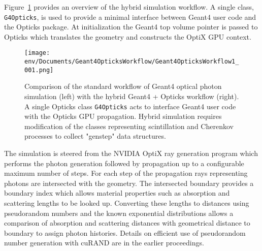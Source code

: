 \documentclass{webofc}
\begin{document}
Figure~\ref{workflow} provides an overview of the hybrid simulation workflow. 
A single class, {\tt G4Opticks}, is used to provide a 
minimal interface between Geant4 user code and 
the Opticks package. 
At initialization the Geant4 top volume pointer is
passed to Opticks which translates the geometry and constructs 
the OptiX GPU context.




%
\begin{figure}
\centering
\texttt{[image: env/Documents/Geant4OpticksWorkflow/Geant4OpticksWorkflow1\_001.png]}
\caption{Comparison of the standard workflow of Geant4 optical photon simulation (left) with the hybrid Geant4 + Opticks workflow (right).
A single Opticks class {\tt G4Opticks} acts to interface Geant4 user code with the Opticks GPU propagation. 
Hybrid simulation requires modification of the classes representing scintillation and Cherenkov processes
to collect "genstep" data structures.}
\label{workflow} 
\end{figure}
%

The simulation is steered from the NVIDIA OptiX ray generation program which 
performs the photon generation followed by propagation up to a configurable maximum 
number of steps. For each step of the propagation rays representing photons are intersected
with the geometry. The intersected boundary provides a boundary index which allows 
material properties such as absorption and scattering lengths to be looked up. 
Converting these lengths to distances using pseudorandom numbers and 
the known exponential distributions allows a comparison of absorption and scattering distances 
with geometrical distance to boundary to assign photon histories. 
Details on efficient use of pseudorandom number generation with cuRAND\cite{curandURL} are in the 
earlier proceedings\cite{chep2016}.
%
%
%
\end{document}
